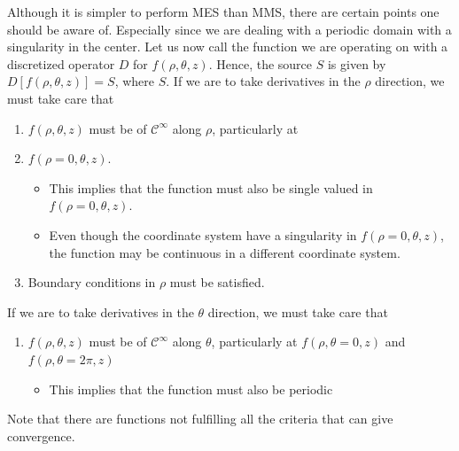 Although it is simpler to perform MES than MMS, there are certain points one should be aware of.
Especially since we are dealing with a periodic domain with a singularity in the center.
Let us now call the function we are operating on with a discretized operator $D$ for $f(\rho,\theta,z)$.
Hence, the source $S$ is given by $D[f(\rho,\theta,z)]=S$, where $S$.
If we are to take derivatives in the $\rho$ direction, we must take care that
%
\vspace{0.5cm}
\begin{enumerate}
    \item $f(\rho,\theta,z)$ must be of $\mathcal{C}^\infty$ along $\rho$, particularly at \item $f(\rho=0,\theta,z)$.%
    \begin{itemize}[noitemsep,nolistsep]
            \item This implies that the function must also be single valued in $f(\rho=0,\theta,z)$.
            \item Even though the coordinate system have a singularity in $f(\rho=0,\theta,z)$, the function may be continuous in a different coordinate system.
    \end{itemize}
  \item Boundary conditions in $\rho$ must be satisfied.
\end{enumerate}
\vspace{0.5cm}
%
If we are to take derivatives in the $\theta$ direction, we must take care that
%
\vspace{0.5cm}
\begin{enumerate}
    \item $f(\rho,\theta,z)$ must be of $\mathcal{C}^\infty$ along $\theta$, particularly at $f(\rho,\theta=0,z)$ and $f(\rho,\theta=2\pi,z)$%
    \begin{itemize}[noitemsep,nolistsep]
            \item This implies that the function must also be periodic
    \end{itemize}
\end{enumerate}
\vspace{0.5cm}
%
Note that there are functions not fulfilling all the criteria that can give convergence.

